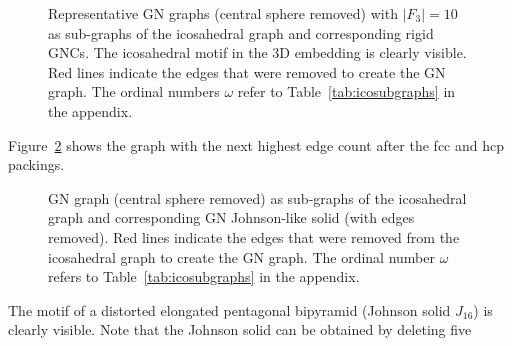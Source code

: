 \begin{figure}[htb]
    \caption{Representative GN graphs (central sphere removed) with $|F_3|=10$
    as sub-graphs of the icosahedral graph and corresponding rigid \acs{GNC}s. The
    icosahedral motif in the 3D embedding is clearly visible.  Red lines
    indicate the edges that were removed to create the GN graph. The ordinal
    numbers $\omega$ refer to Table~\ref{tab:icosubgraphs} in the appendix.}
    \label{fig:GNicographs}
\end{figure}

Figure~\ref{fig:GNJohnsongraph} shows the graph with the next highest edge count
after the \ac{fcc} and \ac{hcp} packings. 
%
\begin{figure}[htb]
    \centering
    \caption{GN graph (central sphere removed) as sub-graphs of the icosahedral
    graph and corresponding GN Johnson-like solid (with edges removed). Red
    lines indicate the edges that were removed from the icosahedral graph to
    create the GN graph. The ordinal number $\omega$ refers to
    Table~\ref{tab:icosubgraphs} in the appendix.}
    \label{fig:GNJohnsongraph}
\end{figure}
%
The motif of a distorted elongated pentagonal bipyramid (Johnson solid $J_{16}$)
is clearly visible. Note that the Johnson solid can be obtained by deleting five
